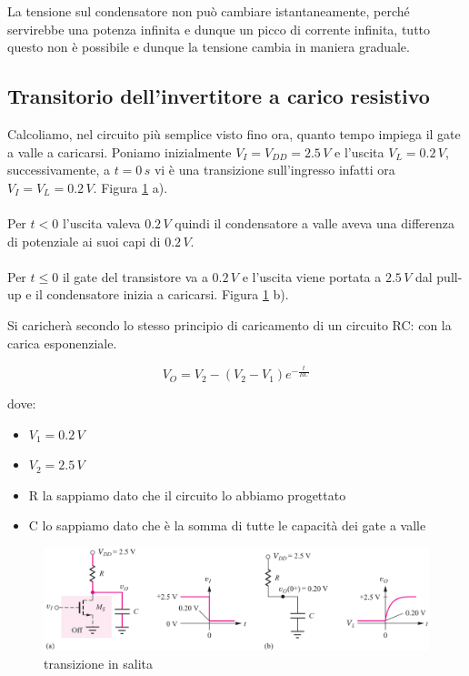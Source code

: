 La tensione sul condensatore non può cambiare istantaneamente, perché servirebbe una potenza infinita e dunque un picco di corrente infinita, tutto questo non è possibile e dunque la tensione cambia in maniera graduale.

\subsection{Transitorio dell'invertitore a carico resistivo}

Calcoliamo, nel circuito più semplice visto fino ora, quanto tempo impiega il gate a valle a caricarsi. Poniamo inizialmente $V_I = V_{DD} = 2.5\,V$ e l'uscita $V_L = 0.2\,V$, successivamente, a $t=0\,s$ vi è una transizione sull'ingresso infatti ora $V_I = V_L = 0.2\,V$. Figura \ref{transitorio} a).

\paragraph{}
Per $t<0$ l'uscita valeva $0.2\,V$ quindi il condensatore a valle aveva una differenza di potenziale ai suoi capi di $0.2\,V$.

\paragraph{}
Per $t \leq 0$ il gate del transistore va a $0.2\,V$ e l'uscita viene portata a $2.5\,V$ dal pull-up e il condensatore inizia a caricarsi. Figura \ref{transitorio} b).

Si caricherà secondo lo stesso principio di caricamento di un circuito RC: con la carica esponenziale.

\begin{equation*}
    V_O = V_2 - (V_2 - V_1)e^{-\frac{t}{RC}}
\end{equation*}

dove:

\begin{itemize}
    \item $V_1 = 0.2\,V$
    \item $V_2 = 2.5\,V$
    \item R la sappiamo dato che il circuito lo abbiamo progettato
    \item C lo sappiamo dato che è la somma di tutte le capacità dei gate a valle
\end{itemize}

\begin{figure}[htbp]
    \centering
    \includegraphics[width=1\linewidth]{img/inver_trans.png}
    \caption{transizione in salita}
    \label{transitorio}
\end{figure}


